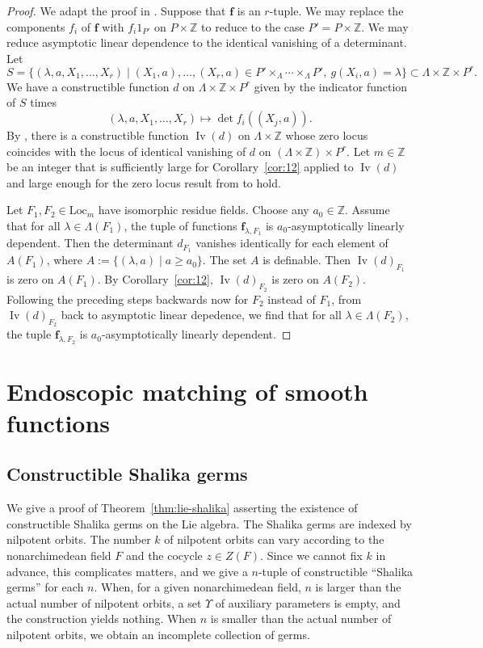 \documentclass[12pt]{amsart}
\newcommand{\op}[1]{\operatorname{#1}}
\newcommand{\ring}[1]{{\mathbb #1}}
\newcommand{\locus}[1]{\op{Iv}(#1)}
\def\Y{\Upsilon}
\def\bf{\mathbf f}
\newcommand{\Loc}{\mathrm{Loc}}
\theoremstyle{plain}
\theoremstyle{definition}
\begin{document}
\begin{proof} We adapt the proof in \cite{CGH2}. Suppose that $\bf$ is
  an $r$-tuple.  We may replace the components $f_i$ of $\bf$ with
  $f_i 1_{P'}$ on $P\times\ring{Z}$ to reduce to the case
  $P'=P\times\ring{Z}$.  We may reduce asymptotic linear dependence to
  the identical vanishing of a determinant.  Let
\[
S = \{(\lambda,a,X_1,\ldots,X_r)\mid (X_1,a),\ldots,(X_r,a)\in P'\times_\Lambda
\cdots\times_\Lambda 
P',~g(X_i,a)= \lambda\} \subset \Lambda\times\ring{Z}\times P^{r}.
\]
We have a constructible function $d$ on $\Lambda\times\ring{Z}\times P^{r}$
given by the indicator function of $S$ times
\[
(\lambda,a,X_1,\ldots,X_r)\mapsto 
\det f_i((X_j,a)).
\]
By \cite{CGH1}, there is a constructible function $\locus{d}$ on
$\Lambda\times\ring{Z}$ whose zero locus coincides with the locus of
identical vanishing of $d$ on $(\Lambda\times\ring{Z})\times P^r$.
Let $m\in\ring{Z}$ be an integer that is sufficiently large for
Corollary~\ref{cor:12} applied to $\locus{d}$ and large enough for the
zero locus result from \cite{CGH1} to hold.

Let $F_1,F_2\in\Loc_m$ have isomorphic residue fields.  Choose any
$a_0\in\ring{Z}$.  Assume that for all $\lambda\in \Lambda(F_1)$, the
tuple of functions $\bf_{\lambda,F_1}$ is $a_0$-asymptotically
linearly dependent.  Then the determinant $d_{F_1}$ vanishes
identically for each element of $A(F_1)$, where $A:=\{(\lambda,a)\mid
a\ge a_0\}$.  The set $A$ is definable.  Then $\locus{d}_{F_1}$ is
zero on $A(F_1)$.  By Corollary~\ref{cor:12}, $\locus{d}_{F_2}$ is
zero on $A(F_2)$.  Following the preceding steps backwards now for
$F_2$ instead of $F_1$, from $\locus{d}_{F_2}$ back to asymptotic
linear depedence, we find that for all $\lambda\in\Lambda(F_2)$, the
tuple $\bf_{\lambda,F_2}$ is $a_0$-asymptotically linearly dependent.
\end{proof}



\section{Endoscopic matching of smooth functions}


\subsection{Constructible Shalika germs}\label{sec:msg}

We give a proof of Theorem~\ref{thm:lie-shalika} asserting the
existence of constructible Shalika germs on the Lie algebra.  The
Shalika germs are indexed by nilpotent orbits. The number $k$ of
nilpotent orbits can vary according to the nonarchimedean field $F$
and the cocycle $z\in Z(F)$.  Since we cannot fix $k$ in advance, this
complicates matters, and we give a $n$-tuple of constructible
``Shalika germs'' for each $n$.  When, for a given nonarchimedean
field, $n$ is larger than the actual number of nilpotent orbits, a set
$\Y$ of auxiliary parameters is empty, and the construction yields
nothing.  When $n$ is smaller than the actual number of nilpotent
orbits, we obtain an incomplete collection of germs.
\end{document}
